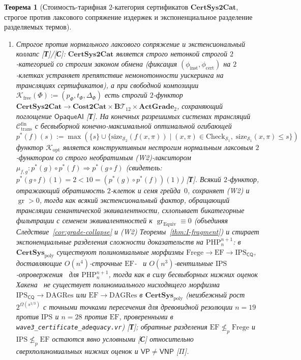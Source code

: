 \documentclass[11pt]{article}
\theoremstyle{plain}
\newtheorem{theorem}{Теорема}[section]
\theoremstyle{definition}
\newcommand{\gr}{\operatorname{gr}}
\begin{document}
\begin{theorem}[Стоимость-тарифная $2$-категория сертификатов $\mathbf{CertSys2Cat}$, строгое против лаксового сопряжение издержек и экспоненциальное разделение разделяемых термов]
\begin{enumerate}[nosep,label=(\roman*)]
\item \emph{Строгое против нормального лаксового сопряжение и экстенсиональный коллапс \textup{[\textbf{Т}]}/\textup{[\textbf{С}]}}: $\mathbf{CertSys2Cat}$ является строго нетонкой строгой $2$-категорией со строгим законом обмена (фиксация $(\phi_{\mathrm{inst}}, \phi_{\mathrm{cert}})$ на $2$-клетках устраняет препятствие немонотонности уискеринга на трансляциях сертификатов), а при свободной композиции $\mathcal{K}_{\mathrm{free}}(\Phi) := (p_\Phi, t_\Phi, \Delta_\Phi)$ есть \emph{строгий} $2$-функтор $\mathbf{CertSys2Cat} \to \mathbf{Cost2Cat} \times \mathbf{B}\mathcal{T}_{12} \times \mathbf{ActGrade}_2$, сохраняющий поглощение $\mathsf{OpaqueAI}$ \textup{[\textbf{Т}]}. На конечных разрешимых системах трансляций $\mathcal{C}_{\mathrm{trans}}^{\mathrm{fin}}$ с бесвыборной конечно-максимальной оптимальной огибающей $p^*(f)(s) := \max(\{s\} \cup \{\mathrm{size}_{\mathcal{S}_2}(f(x,\pi)) \mid (x,\pi) \in \mathrm{Check}_{\mathcal{S}_1},\; \mathrm{size}_{\mathcal{S}_1}(x,\pi) \le s\})$ функтор $\mathcal{K}_{\mathrm{opt}}$ является конструктивным \emph{нестрогим нормальным лаксовым} $2$-функтором со строго необратимым \textup{(W2)}-лакситором $\mu_{f,g} : p^*(g)\circ p^*(f) \Rightarrow p^*(g\circ f)$ (свидетель: $p^*(g\circ f)(1) = 2 < 10 = (p^*(g)\circ p^*(f))(1)$) \textup{[\textbf{Т}]}. Всякий $2$-функтор, отражающий обратимость $2$-клеток и семя грейда~$0$, сохраняет \textup{(W2)} и $\gr > 0$, тогда как всякий экстенсиональный фактор, обращающий трансляции семантической эквивалентности, схлопывает бикатегорные фильтрации с семенем эквивалентностей к $\gr_{\mathrm{Equiv}} \equiv 0$ (объединяя Следствие~\ref{cor:grade-collapse} и \textup{(W2)} Теоремы~\ref{thm:I-fragment}) и стирает экспоненциальные разделения сложности доказательств на $\mathrm{PHP}_n^{n+1}$: в $\mathbf{CertSys}_{\mathrm{poly}}$ существуют полиномиальные морфизмы $\mathrm{Frege} \to \mathrm{EF} \to \mathrm{IPS}_{\mathsf{CQ}}$, доставляющие $O(n^4)$-строчные $\mathrm{EF}$-~\cite{CookReckhow1979} и $O(n^3)$-вентильные $\mathrm{IPS}$-опровержения~\cite{GrochowPitassi2018} для $\mathrm{PHP}_n^{n+1}$, тогда как в силу бесвыборных нижних оценок Хакена~\cite{Haken1985} \emph{не существует} полиномиального нисходящего морфизма $\mathrm{IPS}_{\mathsf{CQ}} \to \mathrm{DAGRes}$ или $\mathrm{EF} \to \mathrm{DAGRes}$ в $\mathbf{CertSys}_{\mathrm{poly}}$ (неизбежный рост $2^{\Omega(s^{1/3})}$ с точными точками пересечения для древовидной резолюции $n = 19$ против $\mathrm{IPS}$ и $n = 28$ против $\mathrm{EF}$, проверенными в \texttt{wave3\_certificate\_adequacy.vr}) \textup{[\textbf{Т}]}; обратные разделения $\mathrm{EF} \not\le_p \mathrm{Frege}$ и $\mathrm{IPS} \not\le_p \mathrm{EF}$ остаются явно условными \textup{[\textbf{С}]} относительно сверхполиномиальных нижних оценок и $\mathsf{VP} \neq \mathsf{VNP}$ \textup{[\textbf{$\Pi$}]}.

\end{enumerate}
\end{theorem}
\end{document}
